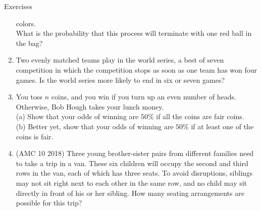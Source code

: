\begin{xcb}{Exercises}
\begin{enumerate}
colors.\\
What is the probability that this process will terminate with one red ball in the bag?
\begin{hint}
\end{hint}
\item {} Two evenly matched teams play in the world series, a best of seven competition in which the competition stops as soon as one team has won four games. Is the world series more likely to end in six or seven games?
\item You toss $n$ coins, and you win if you turn up an even number of heads. Otherwise, Bob Hough takes your lunch money.\\
(a)  Show that your odds of winning are $50\%$ if all the coins are fair coins.\\
(b)  Better yet, show that your odds of winning are $50\%$ if at least one of the coins is
fair.\\
\item(AMC 10 2018)  Three young brother-sister pairs from different families need to take a trip in a van. These six children will occupy the second and third rows in the van, each of which has three seats. To avoid disruptions, siblings may not sit right next to each other in the same row, and no child may sit directly in front of his or her sibling. How many seating arrangements are possible for this trip?
\end{enumerate}
\end{xcb}